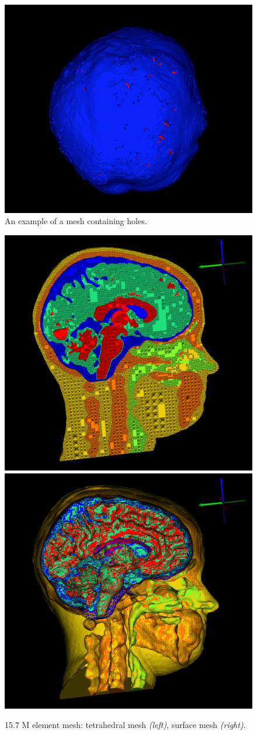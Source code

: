 \begin{figure}[H]
\begin{center}
\includegraphics[width=.60\textwidth]{Figures/mesh_with_holes}
\caption{An example of a mesh containing holes.}
\label{fig:meshholes}
\end{center}
\end{figure}

\begin{figure}[H]
\begin{center}
\includegraphics[width=.49\textwidth]{Figures/smallmesh_2}
\includegraphics[width=.49\textwidth]{Figures/smallmesh_surface}
\caption{15.7 M element mesh: tetrahedral mesh \textit{(left)}, surface mesh \textit{(right)}.}
\label{fig:smallmesh}
\end{center}
\end{figure}

